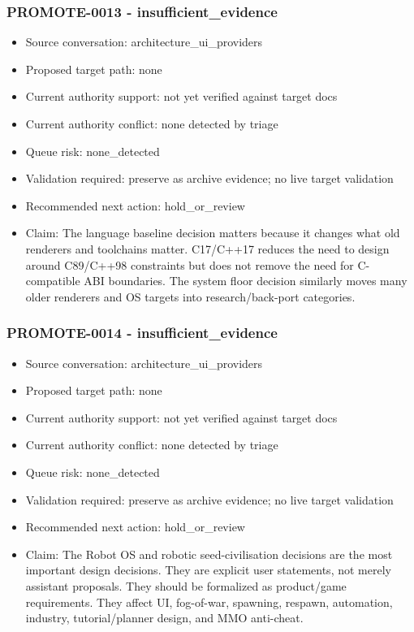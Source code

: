 \documentclass[11pt,a4paper]{report}
\begin{document}
\subsubsection{PROMOTE-0013 - insufficient\_evidence}

\begin{itemize}
\item Source conversation: architecture\_ui\_providers
\item Proposed target path: none
\item Current authority support: not yet verified against target docs
\item Current authority conflict: none detected by triage
\item Queue risk: none\_detected
\item Validation required: preserve as archive evidence; no live target validation
\item Recommended next action: hold\_or\_review
\item Claim: The language baseline decision matters because it changes what old renderers and toolchains matter. C17/C++17 reduces the need to design around C89/C++98 constraints but does not remove the need for C-compatible ABI boundaries. The system floor decision similarly moves many older renderers and OS targets into research/back-port categories.
\end{itemize}

\subsubsection{PROMOTE-0014 - insufficient\_evidence}

\begin{itemize}
\item Source conversation: architecture\_ui\_providers
\item Proposed target path: none
\item Current authority support: not yet verified against target docs
\item Current authority conflict: none detected by triage
\item Queue risk: none\_detected
\item Validation required: preserve as archive evidence; no live target validation
\item Recommended next action: hold\_or\_review
\item Claim: The Robot OS and robotic seed-civilisation decisions are the most important design decisions. They are explicit user statements, not merely assistant proposals. They should be formalized as product/game requirements. They affect UI, fog-of-war, spawning, respawn, automation, industry, tutorial/planner design, and MMO anti-cheat.
\end{itemize}
\end{document}
